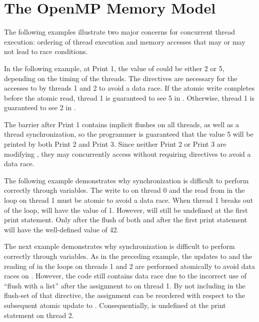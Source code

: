 
\pagebreak
\section{The OpenMP Memory Model}
\label{sec:mem_model}

The following examples illustrate two major concerns for concurrent thread
execution: ordering of thread execution and memory accesses that may or may not
lead to race conditions.

In the following example, at Print 1, the value of  could be either 2
or 5, depending on the timing of the threads. The  directives are
necessary for the accesses to  by threads 1 and 2 to avoid a data race.
If the atomic write completes before the atomic read, thread 1 is guaranteed to
see 5 in . Otherwise, thread 1 is guaranteed to see 2 in .

The barrier after Print 1 contains implicit flushes on all threads, as well as
a thread synchronization, so the programmer is guaranteed that the value 5 will
be printed by both Print 2 and Print 3. Since neither Print 2 or Print 3 are modifying
, they may concurrently access  without requiring 
directives to avoid a data race.



\pagebreak
The following example demonstrates why synchronization is difficult to perform
correctly through variables. The write to  on thread 0 and the read
from  in the loop on thread 1 must be atomic to avoid a data race.
When thread 1 breaks out of the loop,  will have the value of 1.
However,  will still be undefined at the first print statement. Only
after the flush of both  and  after the first print
statement will  have the well-defined value of 42.



\pagebreak
The next example demonstrates why synchronization is difficult to perform
correctly through variables. As in the preceding example, the updates to
 and the reading of  in the loops on threads 1 and 2 are
performed atomically to avoid data races on . However, the code still
contains data race due to the incorrect use of ``flush with a list'' after the
assignment to  on thread 1. By not including  in the
flush-set of that  directive, the assignment can be reordered with
respect to the subsequent atomic update to . Consequentially,
 is undefined at the print statement on thread 2.




